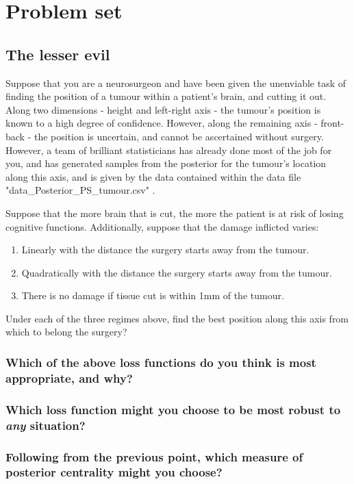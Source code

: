 \documentclass[11pt,fullpage]{book}
\begin{document}
\section{Problem set}
\subsection{The lesser evil}
Suppose that you are a neurosurgeon and have been given the unenviable task of finding the position of a tumour within a patient's brain, and cutting it out. Along two dimensions - height and left-right axis - the tumour's position is known to a high degree of confidence. However, along the remaining axis - front-back - the position is uncertain, and cannot be ascertained without surgery. However, a team of brilliant statisticians has already done most of the job for you, and has generated samples from the posterior for the tumour's location along this axis, and is given by the data contained within the data file "data\_Posterior\_PS\_tumour.csv" .

Suppose that the more brain that is cut, the more the patient is at risk of losing cognitive functions. Additionally, suppose that the damage inflicted varies:

\begin{enumerate}
\item Linearly with the distance the surgery starts away from the tumour.
\item Quadratically with the distance the surgery starts away from the tumour.
\item There is no damage if tissue cut is within 1mm of the tumour.
\end{enumerate}

Under each of the three regimes above, find the best position along this axis from which to belong the surgery?

\subsubsection{Which of the above loss functions do you think is most appropriate, and why?}
\subsubsection{Which loss function might you choose to be most robust to \textit{any} situation?}
\subsubsection{Following from the previous point, which measure of posterior centrality might you choose?}
\end{document}
